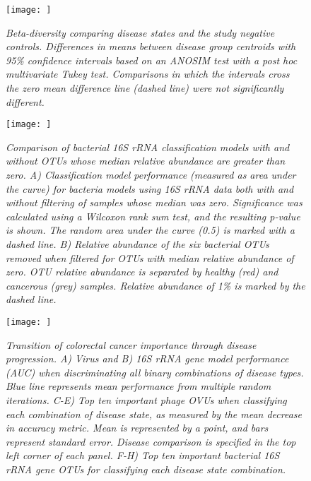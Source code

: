 \documentclass[12pt,]{article}
\begin{document}
\newpage

\begin{figure}[htbp]
\centering
\texttt{[image: ]}
\caption{\emph{Beta-diversity comparing disease states and the study
negative controls. Differences in means between disease group centroids
with 95\% confidence intervals based on an ANOSIM test with a post hoc
multivariate Tukey test. Comparisons in which the intervals cross the
zero mean difference line (dashed line) were not significantly
different.}\label{betaogunegative}}
\end{figure}

\newpage

\begin{figure}[htbp]
\centering
\texttt{[image: ]}
\caption{\emph{Comparison of bacterial 16S rRNA classification models
with and without OTUs whose median relative abundance are greater than
zero. A) Classification model performance (measured as area under the
curve) for bacteria models using 16S rRNA data both with and without
filtering of samples whose median was zero. Significance was calculated
using a Wilcoxon rank sum test, and the resulting p-value is shown. The
random area under the curve (0.5) is marked with a dashed line. B)
Relative abundance of the six bacterial OTUs removed when filtered for
OTUs with median relative abundance of zero. OTU relative abundance is
separated by healthy (red) and cancerous (grey) samples. Relative
abundance of 1\% is marked by the dashed line.}\label{16scompare}}
\end{figure}

\newpage

\begin{figure}[htbp]
\centering
\texttt{[image: ]}
\caption{\emph{Transition of colorectal cancer importance through
disease progression. A) Virus and B) 16S rRNA gene model performance
(AUC) when discriminating all binary combinations of disease types. Blue
line represents mean performance from multiple random iterations. C-E)
Top ten important phage OVUs when classifying each combination of
disease state, as measured by the mean decrease in accuracy metric. Mean
is represented by a point, and bars represent standard error. Disease
comparison is specified in the top left corner of each panel. F-H) Top
ten important bacterial 16S rRNA gene OTUs for classifying each disease
state combination.}\label{transitionmodels}}
\end{figure}

\newpage
\end{document}
